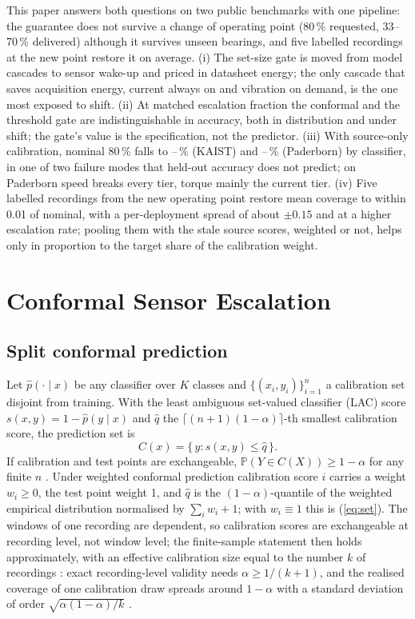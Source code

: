\documentclass{ifacconf}
\begin{document}
This paper answers both questions on two public benchmarks with one pipeline: the guarantee does not survive a change of operating point (80\,\% requested, 33--70\,\% delivered) although it survives unseen bearings, and five labelled recordings at the new point restore it on average. (i) The set-size gate is moved from model cascades to sensor wake-up and priced in datasheet energy; the only cascade that saves acquisition energy, current always on and vibration on demand, is the one most exposed to shift. (ii) At matched escalation fraction the conformal and the threshold gate are indistinguishable in accuracy, both in distribution and under shift; the gate's value is the specification, not the predictor. (iii) With source-only calibration, nominal 80\,\% falls to \covEightyKlr--\covEightyKrf\,\% (KAIST) and \covEightyPrf--\covEightyPlr\,\% (Paderborn) by classifier, in one of two failure modes that held-out accuracy does not predict; on Paderborn speed breaks every tier, torque mainly the current tier. (iv) Five labelled recordings from the new operating point restore mean coverage to within 0.01 of nominal, with a per-deployment spread of about $\pm0.15$ and at a higher escalation rate; pooling them with the stale source scores, weighted or not, helps only in proportion to the target share of the calibration weight.

\section{Conformal Sensor Escalation}

\subsection{Split conformal prediction}\label{sec:scp}
Let $\hat p(\cdot\mid x)$ be any classifier over $K$ classes and $\{(x_i,y_i)\}_{i=1}^n$ a calibration set disjoint from training. With the least ambiguous set-valued classifier (LAC) score $s(x,y)=1-\hat p(y\mid x)$ \citep{sadinle2019} and $\hat q$ the $\lceil (n+1)(1-\alpha)\rceil$-th smallest calibration score, the prediction set is
\begin{equation}
C(x)=\{\,y: s(x,y)\le \hat q\,\}.
\label{eq:set}
\end{equation}
If calibration and test points are exchangeable, $\mathbb P(Y\in C(X))\ge 1-\alpha$ for any finite $n$ \citep{vovk2005}. Under weighted conformal prediction \citep{tibshirani2019covariate,barber2023beyond} calibration score $i$ carries a weight $w_i\ge 0$, the test point weight 1, and $\hat q$ is the $(1-\alpha)$-quantile of the weighted empirical distribution normalised by $\sum_i w_i+1$; with $w_i\equiv 1$ this is (\ref{eq:set}). The windows of one recording are dependent, so calibration scores are exchangeable at recording level, not window level; the finite-sample statement then holds approximately, with an effective calibration size equal to the number $k$ of recordings \citep{dunn2023hierarchical}: exact recording-level validity needs $\alpha\ge 1/(k+1)$, and the realised coverage of one calibration draw spreads around $1-\alpha$ with a standard deviation of order $\sqrt{\alpha(1-\alpha)/k}$ \citep{vovk2012conditional}.
\end{document}
